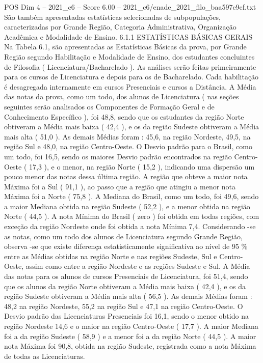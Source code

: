 \begin{textsample}{POS Dim 4 – 2021\_c6 – Score 6.00 – 2021\_c6/enade\_2021\_filo\_baa597e9cf.txt}
São também apresentadas estatísticas selecionadas de subpopulações, caracterizadas por Grande Região, Categoria Administrativa, Organização Acadêmica e Modalidade de Ensino. 6.1.1 ESTATÍSTICAS BÁSICAS GERAIS Na Tabela 6.1, são apresentadas as Estatísticas Básicas da prova, por Grande Região segundo Habilitação e Modalidade de Ensino, dos estudantes concluintes de Filosofia ( Licenciatura/Bacharelado ).
As análises serão feitas primeiramente para os cursos de Licenciatura e depois para os de Bacharelado.
Cada habilitação é desagregada internamente em cursos Presenciais e cursos a Distância.
A Média das notas da prova, como um todo, dos alunos de Licenciatura ( nas seções seguintes serão analisados os Componentes de Formação Geral e de Conhecimento Específico ), foi 48,8, sendo que os estudantes da região Norte obtiveram a Média mais baixa ( 42,4 ), e os da região Sudeste obtiveram a Média mais alta ( 51,0 ).
As demais Médias foram : 45,6, na região Nordeste, 49,5, na região Sul e 48,0, na região Centro-Oeste.
O Desvio padrão para o Brasil, como um todo, foi 16,5, sendo os maiores Desvio padrão encontrados na região Centro-Oeste ( 17,3 ), e o menor, na região Norte ( 15,2 ), indicando uma dispersão um pouco menor das notas dessa última região.
A região que obteve a maior nota Máxima foi a Sul ( 91,1 ), ao passo que a região que atingiu a menor nota Máxima foi a Norte ( 75,8 ).
A Mediana do Brasil, como um todo, foi 49,6, sendo a maior Mediana obtida na região Sudeste ( 52,2 ), e a menor obtida na região Norte ( 44,5 ).
A nota Mínima do Brasil ( zero ) foi obtida em todas regiões, com exceção da região Nordeste onde foi obtida a nota Mínima 7,4.
Considerando -se as notas, como um todo dos alunos de Licenciatura segundo Grande Região, observa -se que existe diferença estatisticamente significativa ao nível de 95 \% entre as Médias obtidas na região Norte e nas regiões Sudeste, Sul e Centro-Oeste, assim como entre a região Nordeste e as regiões Sudeste e Sul.
A Média das notas para os alunos de cursos Presenciais de Licenciatura, foi 51,4, sendo que os alunos da região Norte obtiveram a Média mais baixa ( 42,4 ), e os da região Sudeste obtiveram a Média mais alta ( 56,5 ).
As demais Médias foram : 48,2 na região Nordeste, 55,2 na região Sul e 47,1 na região Centro-Oeste.
O Desvio padrão das Licenciaturas Presenciais foi 16,1, sendo o menor obtido na região Nordeste 14,6 e o maior na região Centro-Oeste ( 17,7 ).
A maior Mediana foi a da região Sudeste ( 58,9 ) e a menor foi a da região Norte ( 44,5 ).
A maior nota Máxima foi 90,8, obtida na região Sudeste, registrada como a nota Máxima de todas as Licenciaturas.

\end{textsample}
